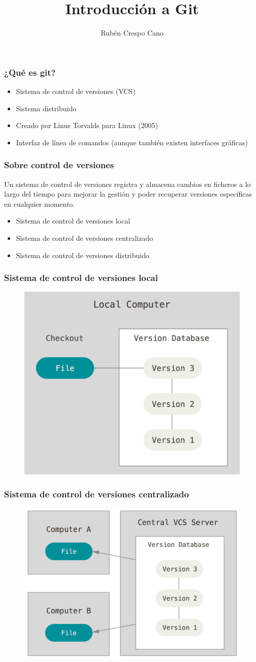 \documentclass{beamer}
\title[Introducción a Git]{Introducción a Git}
\author{Rubén Crespo Cano}
\institute[]
{
https://about.me/rubencrespocano \\
\medskip
\textit{@rcrespocano}
}
\date{}
\begin{document}
\begin{frame}
\titlepage
\end{frame}

\begin{frame}
\frametitle{¿Qué es git?}
\begin{itemize}
\item Sistema de control de versiones (VCS)
\item Sistema distribuido
\item Creado por Linus Torvalds para Linux (2005)
\item Interfaz de línea de comandos (aunque también existen interfaces gráficas)
\end{itemize}
\end{frame}

\begin{frame}
\frametitle{Sobre control de versiones}
Un sistema de control de versiones registra y almacena cambios en ficheros a lo largo del tiempo para mejorar la gestión y poder recuperar versiones específicas en cualquier momento.
\vskip 0.50cm
\begin{itemize}
\item Sistema de control de versiones local
\item Sistema de control de versiones centralizado
\item Sistema de control de versiones distribuido
\end{itemize}
\end{frame}

\begin{frame}
\frametitle{Sistema de control de versiones local}
\begin{figure}
\includegraphics[width=0.50\linewidth]{img/local.png}
\end{figure}
\end{frame}

\begin{frame}
\frametitle{Sistema de control de versiones centralizado}
\begin{figure}
\includegraphics[width=0.50\linewidth]{img/centralized.png}
\end{figure}
\end{frame}
\end{document}
